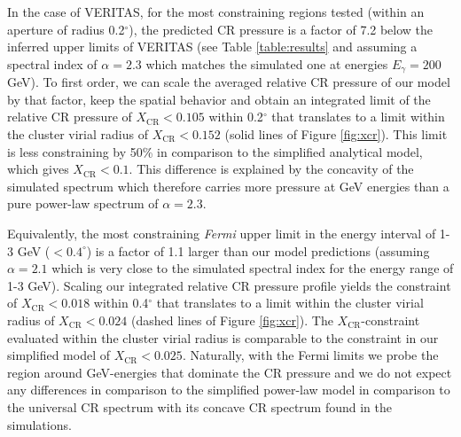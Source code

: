 \documentclass[12pt,manuscript]{aastex}
\newcommand{\CR}{\mathrm{CR}}
\begin{document}
In the case of VERITAS, for the most constraining regions tested (within an aperture of radius
0.2$^{\circ}$), the predicted CR pressure is a factor of 7.2 below the inferred upper limits of
VERITAS (see Table \ref{table:results} and assuming a spectral index of $\alpha=2.3$ which matches
the simulated one at energies $E_\gamma=200$ GeV). To first order, we can scale the averaged
relative CR pressure of our model by that factor, keep the spatial behavior and obtain an integrated
limit of the relative CR pressure of $X_{\CR}<0.105$ within 0.2$^{\circ}$ that translates to a limit
within the cluster virial radius of $X_\CR<0.152$ (solid lines of Figure \ref{fig:xcr}).  This limit
is less constraining by 50\% in comparison to the simplified analytical model, which gives
$X_\CR<0.1$. This difference is explained by the concavity of the simulated spectrum which therefore
carries more pressure at GeV energies than a pure power-law spectrum of $\alpha=2.3$.

Equivalently, the most constraining {\em Fermi} upper limit in the energy interval of 1-3 GeV
($<0.4^\circ$) is a factor of 1.1 larger than our model predictions (assuming $\alpha=2.1$ which is
very close to the simulated spectral index for the energy range of 1-3 GeV). Scaling our integrated
relative CR pressure profile yields the constraint of $X_{\CR}<0.018$ within 0.4$^{\circ}$ that
translates to a limit within the cluster virial radius of $X_\CR<0.024$ (dashed lines of Figure
\ref{fig:xcr}).  The $X_\CR$-constraint evaluated within the cluster virial radius is comparable to
the constraint in our simplified model of $X_\CR<0.025$.  Naturally, with the Fermi limits we probe
the region around GeV-energies that dominate the CR pressure and we do not expect any differences in
comparison to the simplified power-law model in comparison to the universal CR spectrum with its
concave CR spectrum found in the simulations.

%
%
\end{document}
